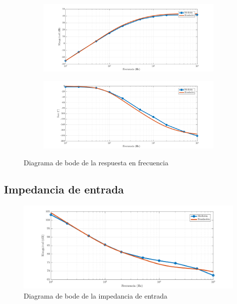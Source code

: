 \documentclass[../../e1_tp1_main.tex]{subfiles}
\begin{document}
\begin{figure} [H]
	\centering
	\begin{subfigure}[c]{\textwidth}
		\centering
		\includegraphics[scale=0.65]{imagenes/e1_tp1_ej2_hf_mag.png}
	\end{subfigure}
	
	
	\begin{subfigure}[c]{\textwidth}
		\centering
		\includegraphics[scale=0.65]{imagenes/e1_tp1_ej2_hf_fase.png}
	\end{subfigure}
	
	\caption{Diagrama de bode de la respuesta en frecuencia}
\end{figure}




\subsection{Impedancia de entrada}

\begin{figure} [H]
	\centering
	\includegraphics[scale=0.65]{imagenes/e1_tp1_ej2_zin_mag.png}	
	\caption{Diagrama de bode de la impedancia de entrada}
\end{figure}
\end{document}
